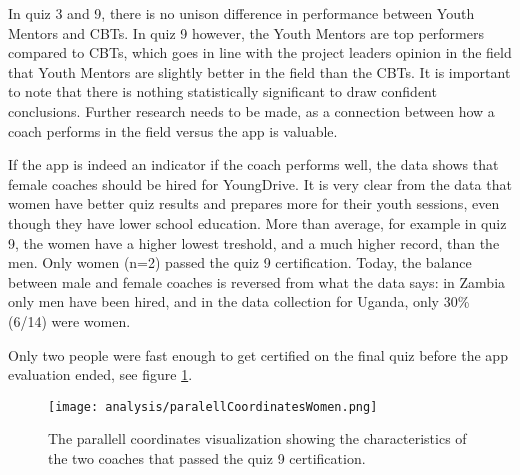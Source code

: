 

In quiz 3 and 9, there is no unison difference in performance between Youth Mentors and CBTs. In quiz 9 however, the Youth Mentors are top performers compared to CBTs, which goes in line with the project leaders opinion in the field that Youth Mentors are slightly better in the field than the CBTs. It is important to note that there is nothing statistically significant to draw confident conclusions. Further research needs to be made, as a connection between how a coach performs in the field versus the app is valuable. %


If the app is indeed an indicator if the coach performs well, the data shows that female coaches should be hired for YoungDrive. It is very clear from the data that women have better quiz results and prepares more for their youth sessions, even though they have lower school education. More than average, for example in quiz 9, the women have a higher lowest treshold, and a much higher record, than the men. Only women (n=2) passed the quiz 9 certification. Today, the balance between male and female coaches is reversed from what the data says: in Zambia only men have been hired, and in the data collection for Uganda, only 30\% (6/14) were women.

Only two people were fast enough to get certified on the final quiz before the app evaluation ended, see figure \ref{fig:quiz9pl}.

\begin{figure}[h]
    \centering
    \texttt{[image: analysis/paralellCoordinatesWomen.png]}
    \caption{The parallell coordinates visualization showing the characteristics of the two coaches that passed the quiz 9 certification.}
    \label{fig:quiz9pl}
\end{figure}

